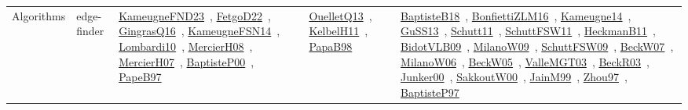 {\begin{longtable}{lp{3cm}>{\raggedright\arraybackslash}p{6cm}>{\raggedright\arraybackslash}p{6cm}>{\raggedright\arraybackslash}p{8cm}}
\index{edge-finder}\index{Algorithms!edge-finder}Algorithms & edge-finder & \href{../works/KameugneFND23.pdf}{KameugneFND23}~\cite{KameugneFND23}, \href{../works/FetgoD22.pdf}{FetgoD22}~\cite{FetgoD22}, \href{../works/GingrasQ16.pdf}{GingrasQ16}~\cite{GingrasQ16}, \href{../works/KameugneFSN14.pdf}{KameugneFSN14}~\cite{KameugneFSN14}, \href{../works/Lombardi10.pdf}{Lombardi10}~\cite{Lombardi10}, \href{../works/MercierH08.pdf}{MercierH08}~\cite{MercierH08}, \href{../works/MercierH07.pdf}{MercierH07}~\cite{MercierH07}, \href{../works/BaptisteP00.pdf}{BaptisteP00}~\cite{BaptisteP00}, \href{../works/PapeB97.pdf}{PapeB97}~\cite{PapeB97} & \href{../works/OuelletQ13.pdf}{OuelletQ13}~\cite{OuelletQ13}, \href{../works/KelbelH11.pdf}{KelbelH11}~\cite{KelbelH11}, \href{../works/PapaB98.pdf}{PapaB98}~\cite{PapaB98} & \href{../works/BaptisteB18.pdf}{BaptisteB18}~\cite{BaptisteB18}, \href{../works/BonfiettiZLM16.pdf}{BonfiettiZLM16}~\cite{BonfiettiZLM16}, \href{../works/Kameugne14.pdf}{Kameugne14}~\cite{Kameugne14}, \href{../works/GuSS13.pdf}{GuSS13}~\cite{GuSS13}, \href{../works/Schutt11.pdf}{Schutt11}~\cite{Schutt11}, \href{../works/SchuttFSW11.pdf}{SchuttFSW11}~\cite{SchuttFSW11}, \href{../works/HeckmanB11.pdf}{HeckmanB11}~\cite{HeckmanB11}, \href{../works/BidotVLB09.pdf}{BidotVLB09}~\cite{BidotVLB09}, \href{../works/MilanoW09.pdf}{MilanoW09}~\cite{MilanoW09}, \href{../works/SchuttFSW09.pdf}{SchuttFSW09}~\cite{SchuttFSW09}, \href{../works/BeckW07.pdf}{BeckW07}~\cite{BeckW07}, \href{../works/MilanoW06.pdf}{MilanoW06}~\cite{MilanoW06}, \href{../works/BeckW05.pdf}{BeckW05}~\cite{BeckW05}, \href{../works/ValleMGT03.pdf}{ValleMGT03}~\cite{ValleMGT03}, \href{../works/BeckR03.pdf}{BeckR03}~\cite{BeckR03}, \href{../works/Junker00.pdf}{Junker00}~\cite{Junker00}, \href{../works/SakkoutW00.pdf}{SakkoutW00}~\cite{SakkoutW00}, \href{../works/JainM99.pdf}{JainM99}~\cite{JainM99}, \href{../works/Zhou97.pdf}{Zhou97}~\cite{Zhou97}, \href{../works/BaptisteP97.pdf}{BaptisteP97}~\cite{BaptisteP97}\\

\end{longtable}}
